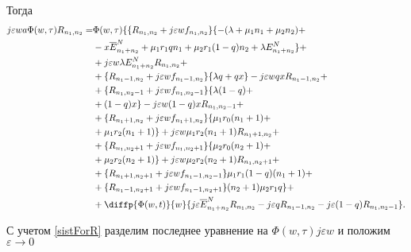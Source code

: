 Тогда
 \begin{equation*}
	\begin{split}
		j\varepsilon wa \Phi (w,\tau)R_{n_{1}, n_{2}}=
		&\Phi (w,\tau)\{\{R_{n_{1}, n_{2}}+j\varepsilon w f_{n_{1}, n_{2}}\}\{-(\lambda+\mu_{1}n_{1}+\mu_{2}n_{2}) +\\
		&-x\overline{E}_{n_{1}+n_{2}}^N+\mu_{1}r_{1}q n_{1}+ \mu_{2}r_{1}(1-q)n_{2}+ \lambda E_{n_{1}+n_{2}}^N\} +\\
		&+j\varepsilon w \lambda E_{n_{1}+n_{2}}^NR_{n_{1}, n_{2}} +\\
		&+\{R_{n_{1}-1, n_{2}}+j\varepsilon w f_{n_{1}-1, n_{2}}\}\{\lambda q+ q  x\}-j\varepsilon wq xR_{n_{1}-1, n_{2}}+\\
		&+\{R_{n_{1}, n_{2}-1}+j\varepsilon w f_{n_{1}, n_{2}-1}\}\{\lambda (1-q) +\\
		&+ (1-q) x\} -j\varepsilon w(1-q) xR_{n_{1}, n_{2}-1} +\\
		&+ \{R_{n_{1}+1, n_{2}}+j\varepsilon w f_{n_{1}+1, n_{2}}\}\{\mu_{1} r_{0}(n_{1}+1)+\\
		& + \mu_{1} r_{2}(n_{1}+1)\}+j\varepsilon w\mu_{1} r_{2}(n_{1}+1)R_{n_{1}+1, n_{2}}+\\
		&+ \{R_{n_{1}, n_{2}+1}+j\varepsilon w f_{n_{1}, n_{2}+1}\}\{\mu_{2} r_{0}(n_{2}+1)+\\
		& + \mu_{2} r_{2} (n_{2}+1)\} +j\varepsilon w\mu_{2} r_{2} (n_{2}+1)R_{n_{1}, n_{2}+1}+\\
		&+\{R_{n_{1}+1, n_{2}+1}+j\varepsilon w f_{n_{1}-1, n_{2}-1}\}\mu_{1} r_{1}(1-q)(n_{1}+1) +\\
		&+\{R_{n_{1}-1, n_{2}+1}+j\varepsilon w f_{n_{1}-1, n_{2}+1}\}(n_{2}+1)\mu_{2} r_{1}q\}  +\\
		&+ \diffp{\Phi(w,t)}{w}\{j\varepsilon \overline{E}_{n_{1}+n_{2}}^NR_{n_{1}, n_{2}}-  j\varepsilon q R_{n_{1}-1, n_{2}}-j \varepsilon (1-q) R_{n_{1}, n_{2}-1}\}.
	\end{split}
\end{equation*}

С учетом \eqref{sistForR} разделим последнее уравнение на $\Phi (w, \tau)j\varepsilon w$ и положим $\varepsilon \rightarrow 0$

